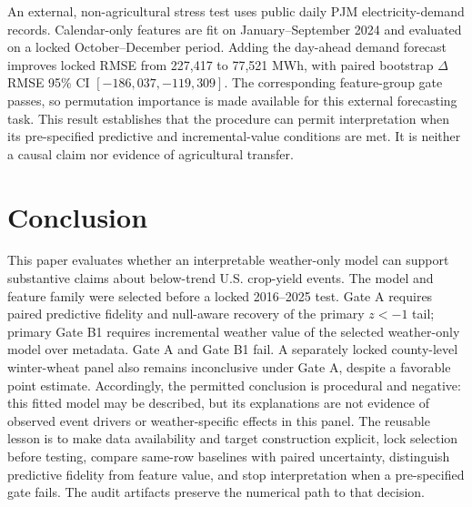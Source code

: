 \documentclass[conference]{IEEEtran}
\begin{document}
An external, non-agricultural stress test uses public daily PJM electricity-demand
records. Calendar-only features are fit on January--September 2024 and evaluated
on a locked October--December period. Adding the day-ahead demand forecast improves
locked RMSE from 227,417 to 77,521 MWh, with paired bootstrap $\Delta$RMSE
95\% CI $[-186,037,-119,309]$. The corresponding feature-group gate passes, so
permutation importance is made available for this external forecasting task. This
result establishes that the procedure can permit interpretation when its
pre-specified predictive and incremental-value conditions are met. It is neither a
causal claim nor evidence of agricultural transfer.

\section{Conclusion}
This paper evaluates whether an interpretable weather-only model can support
substantive claims about below-trend U.S. crop-yield events. The model and feature
family were selected before a locked 2016--2025 test. Gate A requires paired
predictive fidelity and null-aware recovery of the primary $z<-1$ tail; primary
Gate B1 requires incremental weather value of the selected weather-only model over
metadata. Gate A and Gate B1 fail. A separately locked county-level winter-wheat
panel also remains inconclusive under Gate A, despite a favorable point estimate.
Accordingly,
the permitted conclusion is procedural and negative: this fitted model may be
described, but its explanations are not evidence of observed event drivers or
weather-specific effects in this panel. The reusable lesson is to make data
availability and target construction explicit, lock selection before testing,
compare same-row baselines with paired uncertainty, distinguish predictive
fidelity from feature value, and stop interpretation when a pre-specified gate
fails. The audit artifacts preserve the numerical path to that decision.



\end{document}
